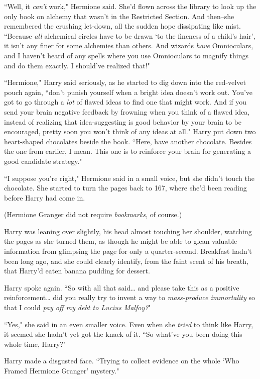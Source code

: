 ``Well, it \emph{can't} work," Hermione said. She'd flown across the library to look up the only book on alchemy that wasn't in the Restricted Section. And then\---she remembered the crushing let-down, all the sudden hope dissipating like mist. ``Because \emph{all} alchemical circles have to be drawn `to the fineness of a child's hair', it isn't any finer for some alchemies than others. And wizards \emph{have} Omnioculars, and I haven't heard of any spells where you use Omnioculars to magnify things and do them exactly. I should've realized that!"

``Hermione," Harry said seriously, as he started to dig down into the red-velvet pouch again, ``don't punish yourself when a bright idea doesn't work out. You've got to go through a \emph{lot} of flawed ideas to find one that might work. And if you send your brain negative feedback by frowning when you think of a flawed idea, instead of realizing that idea-suggesting is good behavior by your brain to be encouraged, pretty soon you won't think of any ideas at all." Harry put down two heart-shaped chocolates beside the book. ``Here, have another chocolate. Besides the one from earlier, I mean. This one is to reinforce your brain for generating a good candidate strategy."

``I suppose you're right," Hermione said in a small voice, but she didn't touch the chocolate. She started to turn the pages back to 167, where she'd been reading before Harry had come in.

(Hermione Granger did not require \emph{bookmarks}, of course.)

Harry was leaning over slightly, his head almost touching her shoulder, watching the pages as she turned them, as though he might be able to glean valuable information from glimpsing the page for only a quarter-second. Breakfast hadn't been long ago, and she could clearly identify, from the faint scent of his breath, that Harry'd eaten banana pudding for dessert.

Harry spoke again. ``So with all that said{\ldots} and please take this as a positive reinforcement{\ldots} did you really try to invent a way to \emph{mass-produce immortality} so that I could \emph{pay off my debt to Lucius Malfoy?}"

``Yes," she said in an even smaller voice. Even when she \emph{tried} to think like Harry, it seemed she hadn't yet got the knack of it. ``So what've you been doing this whole time, Harry?"

Harry made a disgusted face. ``Trying to collect evidence on the whole `Who Framed Hermione Granger' mystery."

